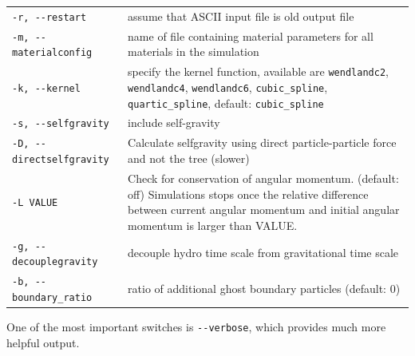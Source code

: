 \documentclass[10pt,fleqn,twoside]{article}
\begin{document}
\begin{table}
\begin{tabular}[b]{p{5cm} p{9cm}}
  \verb|-r, --restart| & assume that ASCII input file is old output file                                                                                                                                                          \\
  \verb|-m, --materialconfig| & name of file containing material parameters for all materials in the simulation                                                                                                                          \\
  \verb|-k, --kernel| & specify the kernel function, available are \verb|wendlandc2|, \verb|wendlandc4|, \verb|wendlandc6|, \verb|cubic_spline|, \verb|quartic_spline|, default: \verb|cubic_spline| \\
  \verb|-s, --selfgravity| & include self-gravity                                                                                                                                                                                     \\
  \verb|-D, --directselfgravity| & Calculate selfgravity using direct particle-particle force and not the tree (slower)                                                                                                                     \\
  \verb|-L VALUE| & Check for conservation of angular momentum. (default: off)
  Simulations stops once the relative difference between current angular momentum and initial
  angular momentum is larger than VALUE.                                                                                                                                                                                             \\
  \verb|-g, --decouplegravity| & decouple hydro time scale from gravitational time scale                                                                                                                                                  \\
  \verb|-b, --boundary_ratio| & ratio of additional ghost boundary particles (default: 0)                                                                                                                                                \\
  \hline
 \end{tabular}
 \label{tab:cmd-line-options}
\end{table}

One of the most important switches is \verb|--verbose|, which provides much more helpful output.
\end{document}
